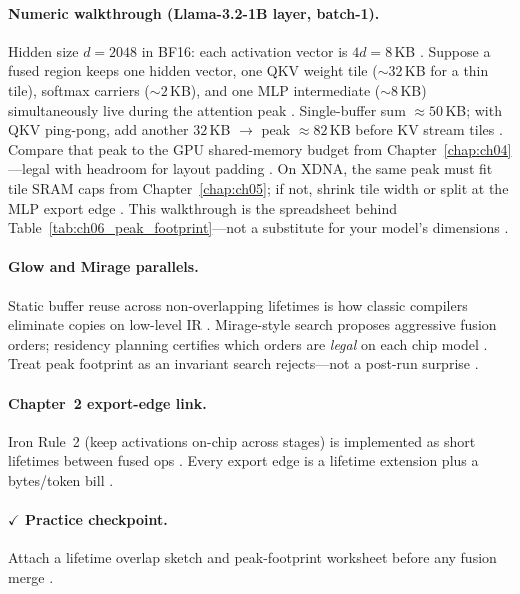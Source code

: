 \paragraph{Numeric walkthrough (Llama-3.2-1B layer, batch-1).}
Hidden size $d{=}2048$ in BF16: each activation vector is $4d{=}8$\,KB \citep{taxbreak2026,kwon2023vllm}.
Suppose a fused region keeps one hidden vector, one QKV weight tile (${\sim}32$\,KB for a thin tile), softmax carriers (${\sim}2$\,KB), and one MLP intermediate (${\sim}8$\,KB) simultaneously live during the attention peak \citep{dao2022flashattention}.
Single-buffer sum ${\approx}50$\,KB; with QKV ping-pong, add another $32$\,KB $\rightarrow$ peak ${\approx}82$\,KB before KV stream tiles \citep{semianalysis2024tma}.
Compare that peak to the GPU shared-memory budget from Chapter~\ref{chap:ch04}---legal with headroom for layout padding \citep{nvidia2022hopper,yirage2026}.
On XDNA, the same peak must fit tile SRAM caps from Chapter~\ref{chap:ch05}; if not, shrink tile width or split at the MLP export edge \citep{amd2024xdna,amd2024aie}.
This walkthrough is the spreadsheet behind Table~\ref{tab:ch06_peak_footprint}---not a substitute for your model's dimensions \citep{yirage2026,memoryfloor2026}.

\paragraph{Glow and Mirage parallels.}
Static buffer reuse across non-overlapping lifetimes is how classic compilers eliminate copies on low-level IR \citep{rotem2018glow}.
Mirage-style search proposes aggressive fusion orders; residency planning certifies which orders are \emph{legal} on each chip model \citep{wu2024mirage,yirage2026}.
Treat peak footprint as an invariant search rejects---not a post-run surprise \citep{mpk2025,chen2020compilerbasedhardw}.

\paragraph{Chapter~2 export-edge link.}
Iron Rule~2 (keep activations on-chip across stages) is implemented as short lifetimes between fused ops \citep{chen2020compilerbasedhardw,memoryfloor2026}.
Every export edge is a lifetime extension plus a bytes/token bill \citep{taxbreak2026,dao2022flashattention}.

\paragraph{$\checkmark$ Practice checkpoint.}
Attach a lifetime overlap sketch and peak-footprint worksheet before any fusion merge \citep{yirage2026,taxbreak2026}.

